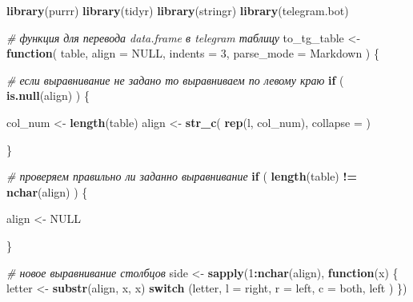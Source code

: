 \documentclass[
]{book}
\newenvironment{Shaded}{\begin{snugshade}}{\end{snugshade}}
\newcommand{\AttributeTok}[1]{\textcolor[rgb]{0.13,0.29,0.53}{#1}}
\newcommand{\CommentTok}[1]{\textcolor[rgb]{0.56,0.35,0.01}{\textit{#1}}}
\newcommand{\ConstantTok}[1]{\textcolor[rgb]{0.56,0.35,0.01}{#1}}
\newcommand{\ControlFlowTok}[1]{\textcolor[rgb]{0.13,0.29,0.53}{\textbf{#1}}}
\newcommand{\DecValTok}[1]{\textcolor[rgb]{0.00,0.00,0.81}{#1}}
\newcommand{\FunctionTok}[1]{\textcolor[rgb]{0.13,0.29,0.53}{\textbf{#1}}}
\newcommand{\NormalTok}[1]{#1}
\newcommand{\OtherTok}[1]{\textcolor[rgb]{0.56,0.35,0.01}{#1}}
\newcommand{\SpecialCharTok}[1]{\textcolor[rgb]{0.81,0.36,0.00}{\textbf{#1}}}
\newcommand{\StringTok}[1]{\textcolor[rgb]{0.31,0.60,0.02}{#1}}
\begin{document}
\begin{Shaded}
\begin{Highlighting}[]
\FunctionTok{library}\NormalTok{(purrr)}
\FunctionTok{library}\NormalTok{(tidyr)}
\FunctionTok{library}\NormalTok{(stringr)}
\FunctionTok{library}\NormalTok{(telegram.bot)}

\CommentTok{\# функция для перевода data.frame в telegram таблицу }
\NormalTok{to\_tg\_table }\OtherTok{\textless{}{-}} \ControlFlowTok{function}\NormalTok{( table, }\AttributeTok{align =} \ConstantTok{NULL}\NormalTok{, }\AttributeTok{indents =} \DecValTok{3}\NormalTok{, }\AttributeTok{parse\_mode =} \StringTok{\textquotesingle{}Markdown\textquotesingle{}}\NormalTok{ ) \{}
  
  \CommentTok{\# если выравнивание не задано то выравниваем по левому краю}
  \ControlFlowTok{if}\NormalTok{ ( }\FunctionTok{is.null}\NormalTok{(align) ) \{}
    
\NormalTok{    col\_num }\OtherTok{\textless{}{-}} \FunctionTok{length}\NormalTok{(table)}
\NormalTok{    align   }\OtherTok{\textless{}{-}} \FunctionTok{str\_c}\NormalTok{( }\FunctionTok{rep}\NormalTok{(}\StringTok{\textquotesingle{}l\textquotesingle{}}\NormalTok{, col\_num), }\AttributeTok{collapse =} \StringTok{\textquotesingle{}\textquotesingle{}}\NormalTok{ )}
    
\NormalTok{  \}}
  
  \CommentTok{\# проверяем правильно ли заданно выравнивание}
  \ControlFlowTok{if}\NormalTok{ ( }\FunctionTok{length}\NormalTok{(table) }\SpecialCharTok{!=} \FunctionTok{nchar}\NormalTok{(align) ) \{}
    
\NormalTok{    align }\OtherTok{\textless{}{-}} \ConstantTok{NULL}
    
\NormalTok{  \}}
  
  \CommentTok{\# новое выравнивание столбцов }
\NormalTok{  side }\OtherTok{\textless{}{-}} \FunctionTok{sapply}\NormalTok{(}\DecValTok{1}\SpecialCharTok{:}\FunctionTok{nchar}\NormalTok{(align), }
                 \ControlFlowTok{function}\NormalTok{(x) \{ }
\NormalTok{                   letter }\OtherTok{\textless{}{-}} \FunctionTok{substr}\NormalTok{(align, x, x)}
                   \ControlFlowTok{switch}\NormalTok{ (letter,}
                           \StringTok{\textquotesingle{}l\textquotesingle{}} \OtherTok{=} \StringTok{\textquotesingle{}right\textquotesingle{}}\NormalTok{,}
                           \StringTok{\textquotesingle{}r\textquotesingle{}} \OtherTok{=} \StringTok{\textquotesingle{}left\textquotesingle{}}\NormalTok{,}
                           \StringTok{\textquotesingle{}c\textquotesingle{}} \OtherTok{=} \StringTok{\textquotesingle{}both\textquotesingle{}}\NormalTok{,}
                           \StringTok{\textquotesingle{}left\textquotesingle{}}
\NormalTok{                   )}
\NormalTok{                 \})}
  

\end{Highlighting}
\end{Shaded}
\end{document}
